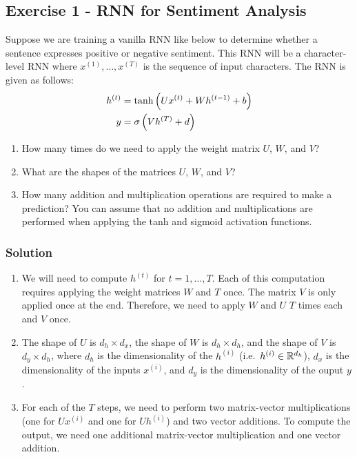 \documentclass[
  letterpaper,
  DIV=11,
  numbers=noendperiod]{scrartcl}
\author{}
\date{}
\begin{document}
\subsection{Exercise 1 - RNN for Sentiment
Analysis}\label{exercise-1---rnn-for-sentiment-analysis}

Suppose we are training a vanilla RNN like below to determine whether a
sentence expresses positive or negative sentiment. This RNN will be a
character-level RNN where \(x^{(1)}, \ldots, x^{(T)}\) is the sequence
of input characters. The RNN is given as follows: \begin{align*}
h^{(t)} &= \tanh\left(U x^{(t)} + W h^{(t-1)} + b\right) \\
y &= \sigma\left(V h^{(T)} + d\right)
\end{align*}

\begin{enumerate}
\def\labelenumi{(\alph{enumi})}
\item
  How many times do we need to apply the weight matrix \(U\), \(W\), and
  \(V\)?
\item
  What are the shapes of the matrices \(U\), \(W\), and \(V\)?
\item
  How many addition and multiplication operations are required to make a
  prediction? You can assume that no addition and multiplications are
  performed when applying the tanh and sigmoid activation functions.
\end{enumerate}

\subsubsection{Solution}\label{solution}

\begin{enumerate}
\def\labelenumi{(\alph{enumi})}
\item
  We will need to compute \(h^{(t)}\) for \(t = 1, \ldots, T\). Each of
  this computation requires applying the weight matrices \(W\) and \(T\)
  once. The matrix \(V\) is only applied once at the end. Therefore, we
  need to apply \(W\) and \(U\) \(T\) times each and \(V\) once.
\item
  The shape of \(U\) is \(d_h \times d_x\), the shape of \(W\) is
  \(d_h \times d_h\), and the shape of \(V\) is \(d_y \times d_h\),
  where \(d_h\) is the dimensionality of the \(h^{(i)}\)
  (i.e.~\(h^{(i)}\in\mathbb{R}^{d_h}\)), \(d_x\) is the dimensionality of the
  inputs \(x^{(i)}\), and \(d_y\) is the dimensionality of the ouput
  \(y\).
\item
  For each of the \(T\) steps, we need to perform two matrix-vector
  multiplications (one for \(Ux^{(i)}\) and one for \(Uh^{(i)}\)) and
  two vector additions. To compute the output, we need one additional
  matrix-vector multiplication and one vector addition.
\end{enumerate}
\end{document}
